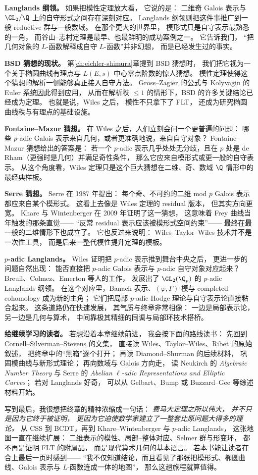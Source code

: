 \textbf{Langlands 纲领。}
如果把模性定理放大看，
它说的是：
二维奇 Galois 表示与 $\GL_2/\Q$ 上的自守形式之间存在深刻对应。
Langlands 纲领则把这件事推广到一般 reductive 群与一般数域。
在那个更大的世界里，
模形式只是自守表示最熟悉的一角，
而谷山--志村定理是最早、也最鲜明的成功案例之一。
它告诉我们，
“把几何对象的 $L$-函数解释成自守 $L$-函数”并非幻想，
而是已经发生过的事实。

\textbf{BSD 猜想的现状。}
第\ref{ch:eichler-shimura}章提到 BSD 猜想时，
我们把它视为一个关于椭圆曲线有理点与 $L(E,s)$ 中心零点阶数的惊人猜想。
模性定理使得这个猜想的解析一侧能够真正接入自守方法。
Gross--Zagier 的公式与 Kolyvagin 的 Euler 系统因此得到应用，
从而在解析秩 $\le 1$ 的情形下，BSD 的许多关键结论已经成为定理。
也就是说，Wiles 之后，
模性不只拿下了 FLT，
还成为研究椭圆曲线秩与有理点的基础设施。

\textbf{Fontaine--Mazur 猜想。}
在 Wiles 之后，人们立刻会问一个更普遍的问题：
哪些 $p$-adic Galois 表示来自几何，或者更准确地说，来自自守对象？
Fontaine--Mazur 猜想给出的答案是：
若一个 $p$-adic 表示几乎处处无分歧，且在 $p$ 处是 de Rham（更强时是几何）并满足奇性条件，
那么它应来自模形式或更一般的自守表示。
从这个角度看，Wiles 定理只是这个巨大猜想在二维、奇、数域 $\Q$ 情形中的最经典样板。

\textbf{Serre 猜想。}
Serre 在 1987 年提出：
每个奇、不可约的二维 mod $p$ Galois 表示都应来自某个模形式。
这看上去像是 Wiles 定理的 residual 版本，
但其实方向更宽。
Khare 与 Wintenberger 在 2009 年证明了这一猜想，
这意味着 Frey 曲线当年触发的那条直觉——
“反常 residual 表示应该被模形式空间约束”——
最终在最一般的二维情形下也成立了。
它也反过来说明：
Wiles--Taylor--Wiles 技术并不是一次性工具，
而是后来一整代模性提升定理的模板。

\textbf{$p$-adic Langlands。}
Wiles 证明把 $p$-adic 表示推到舞台中央之后，
更进一步的问题自然出现：
能否直接把 $p$-adic Galois 表示与 $p$-adic 自守对象对应起来？
Breuil、Colmez、Emerton 等人的工作，
发展出了 $\GL_2(\Q_p)$ 的 $p$-adic Langlands 纲领。
在这个对应里，Banach 表示、$(\varphi,\Gamma)$-模与 completed cohomology 成为新的主角；
它们把局部 $p$-adic Hodge 理论与自守表示论直接粘合起来。
这条道路仍在快速发展，
其气质与终章非常相像：
一边是局部表示论，
另一边是几何与算术，
中间靠极其精细的同调与局部环技术搭桥。

\textbf{给继续学习的读者。}
若想沿着本章继续前进，
我会按下面的路线读书：
先回到 Cornell--Silverman--Stevens 的文集，
直接读 Wiles、Taylor--Wiles、Ribet 的原始叙述，
把终章中的“黑箱”逐个打开；
再读 Diamond--Shurman 的后续材料，
巩固模曲线与新形式理论；
再向数域与 Galois 方向走，
读 Neukirch 的 \emph{Algebraic Number Theory} 与 Serre 的 \emph{Abelian $\ell$-adic Representations and Elliptic Curves}；
若对 Langlands 好奇，
可以从 Gelbart、Bump 或 Buzzard--Gee 等综述材料开始。

写到最后，我很想把终章的精神浓缩成一句话：
\emph{费马大定理之所以伟大，
并不只是因为它终于被证明，
更因为它迫使数学家建立了一整套比原问题大得多的理论。}
从 CSS 到 BCDT，再到 Khare--Wintenberger 与 $p$-adic Langlands，
这张地图一直在继续扩展：
二维表示的模性、局部--整体对应、Selmer 群与形变环，
都不再是证明 FLT 的附属品，
而是现代算术几何的基本语言。
若本书能让读者在合上最后一页时感到——
“我不仅知道结论，而且看见了那张把模形式、椭圆曲线、Galois 表示与 $L$-函数连成一体的地图”，
那么这趟旅程就算值得。

